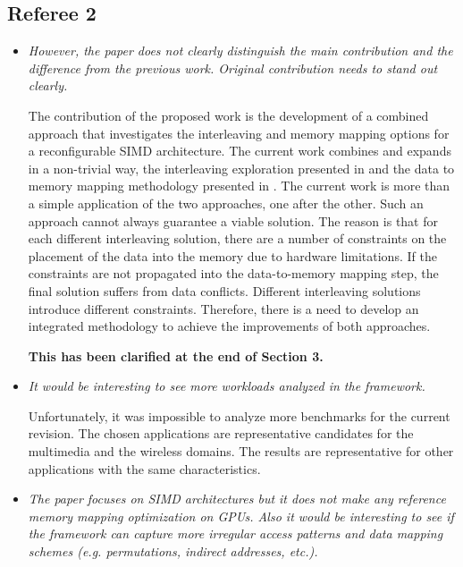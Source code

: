 \documentclass[12pt,a4paper,notitlepage]{article}
\begin{document}
\subsection*{Referee 2}

\begin{itemize}

\item \textit{However, the paper does not clearly distinguish the main contribution and 
the difference from the previous work. Original contribution needs to stand
out clearly.}

The contribution of the proposed work is the development of a combined approach that investigates the interleaving and memory mapping options for a reconfigurable SIMD architecture.  
The current work combines and expands in a non-trivial way, the interleaving exploration presented in \cite{sharma2013data} and the data to memory mapping methodology presented in \cite{filippopoulos2013exploration}. 
The current work is more than a simple application of the two approaches, one after the other.
Such an approach cannot always guarantee a viable solution.
The reason is that for each different interleaving solution, there are a number of constraints on the placement of the data into the memory due to hardware limitations.
If the constraints are not propagated into the data-to-memory mapping step, the final solution suffers from data conflicts.
Different interleaving solutions introduce different constraints. 
Therefore, there is a need to develop an integrated methodology to achieve the improvements of both approaches.

\textbf{This has been clarified at the end of Section 3.}

\item \textit{It would be interesting to see more workloads analyzed in the framework.}

Unfortunately, it was impossible to analyze more benchmarks for the current revision. 
The chosen applications are representative candidates for the multimedia and the wireless domains.
The results are representative for other applications with the same characteristics.

\item \textit{The paper focuses on SIMD architectures but it does not make any reference memory mapping optimization on GPUs. Also it would be interesting to
see if the framework can capture more irregular access patterns and data mapping schemes (e.g. permutations, indirect addresses, etc.). }


\end{itemize}
\end{document}
